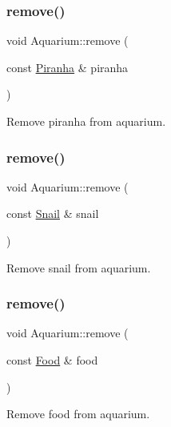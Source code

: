 \subsubsection{\texorpdfstring{remove()}{remove()}\hspace{0.1cm}{\footnotesize\ttfamily [2/5]}}
{\footnotesize\ttfamily void Aquarium\+::remove (\begin{DoxyParamCaption}\item[{const \mbox{\hyperlink{class_piranha}{Piranha}} \&}]{piranha }\end{DoxyParamCaption})}



Remove piranha from aquarium. 

\mbox{\label{class_aquarium_aaa4e4751684ac4f0ea0f818b0ac0eb9c}} 
\subsubsection{\texorpdfstring{remove()}{remove()}\hspace{0.1cm}{\footnotesize\ttfamily [3/5]}}
{\footnotesize\ttfamily void Aquarium\+::remove (\begin{DoxyParamCaption}\item[{const \mbox{\hyperlink{class_snail}{Snail}} \&}]{snail }\end{DoxyParamCaption})}



Remove snail from aquarium. 

\mbox{\label{class_aquarium_add8721889913594c0da084d780406d68}} 
\subsubsection{\texorpdfstring{remove()}{remove()}\hspace{0.1cm}{\footnotesize\ttfamily [4/5]}}
{\footnotesize\ttfamily void Aquarium\+::remove (\begin{DoxyParamCaption}\item[{const \mbox{\hyperlink{class_food}{Food}} \&}]{food }\end{DoxyParamCaption})}



Remove food from aquarium. 

